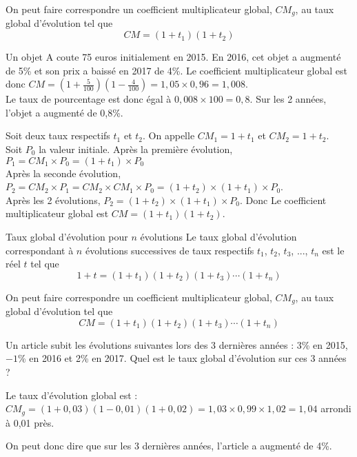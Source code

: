 \begin{Rq}
On peut faire correspondre un coefficient multiplicateur global, $CM_g$, au taux global d'évolution tel que $$CM = \left(1+t_1\right)\left(1+t_2\right)$$
\end{Rq}


\begin{Ex}
Un objet A coute 75 euros initialement en 2015. En 2016, cet objet a augmenté de 5\% et son prix a baissé en 2017 de 4\%. Le coefficient multiplicateur global est donc $CM = \left(1+\frac{5}{100}\right)\left(1-\frac{4}{100}\right)=1,05 \times 0,96 = 1,008$.\\
Le taux de pourcentage est donc égal à $0,008 \times 100 = 0,8$. Sur les 2 années, l'objet a augmenté de 0,8\%. 
\end{Ex}


\begin{Dem}
Soit deux taux respectifs $t_1$ et $t_2$. On appelle $CM_1 = 1+t_1$ et $CM_2 = 1+t_2$.\\
Soit $P_0$ la valeur initiale. Après la première évolution, $P_1=CM_1 \times P_0 = \left(1+t_1\right)\times P_0 $\\
Après la seconde évolution, $P_2=CM_2 \times P_1 = CM_2 \times CM_1 \times P_0 =\left(1+t_2\right)\times \left(1+t_1 \right)\times P_0 $.\\
Après les 2 évolutions, $P_2=\left(1+t_2\right)\times \left(1+t_1\right)\times P_0 $. Donc Le coefficient multiplicateur global est $CM = \left(1+t_1\right)\left(1+t_2\right)$.
\end{Dem}

\begin{ThT}{Taux global d'évolution pour $n$ évolutions}
Le taux global d'évolution correspondant à $n$ évolutions successives de taux respectifs $t_1$, $t_2$, $t_3$, ..., $t_n$ est le réel $t$ tel que $$1+t = \left(1+t_1\right)\left(1+t_2\right)\left(1+t_3\right)\cdots \left(1+t_n\right)$$
\end{ThT}

\begin{Rq}
On peut faire correspondre un coefficient multiplicateur global, $CM_g$, au taux global d'évolution tel que $$CM = \left(1+t_1\right) \left(1+t_2\right)\left(1+t_3\right)\cdots \left(1+t_n\right)$$
\end{Rq}

\begin{Ex}
Un article subit les évolutions suivantes lors des 3 dernières années : 3\% en 2015, $-1$\% en 2016 et 2\% en 2017. Quel est le taux global d'évolution sur ces 3 années ?

Le taux d'évolution global est : $CM_g=(1+0,03)(1-0,01)(1+0,02)=1,03 \times 0,99 \times 1,02 = 1,04$ arrondi à 0,01 près.

On peut donc dire que sur les 3 dernières années, l'article a augmenté de 4\%.
\end{Ex}




